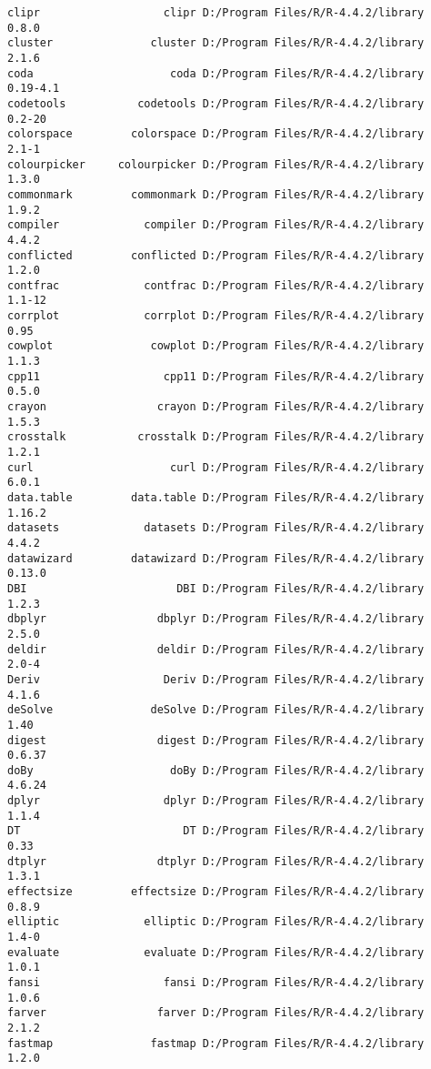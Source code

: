 \documentclass[
  letterpaper,
  DIV=11,
  numbers=noendperiod]{scrreprt}
\begin{document}
\begin{verbatim}
clipr                   clipr D:/Program Files/R/R-4.4.2/library      0.8.0
cluster               cluster D:/Program Files/R/R-4.4.2/library      2.1.6
coda                     coda D:/Program Files/R/R-4.4.2/library   0.19-4.1
codetools           codetools D:/Program Files/R/R-4.4.2/library     0.2-20
colorspace         colorspace D:/Program Files/R/R-4.4.2/library      2.1-1
colourpicker     colourpicker D:/Program Files/R/R-4.4.2/library      1.3.0
commonmark         commonmark D:/Program Files/R/R-4.4.2/library      1.9.2
compiler             compiler D:/Program Files/R/R-4.4.2/library      4.4.2
conflicted         conflicted D:/Program Files/R/R-4.4.2/library      1.2.0
contfrac             contfrac D:/Program Files/R/R-4.4.2/library     1.1-12
corrplot             corrplot D:/Program Files/R/R-4.4.2/library       0.95
cowplot               cowplot D:/Program Files/R/R-4.4.2/library      1.1.3
cpp11                   cpp11 D:/Program Files/R/R-4.4.2/library      0.5.0
crayon                 crayon D:/Program Files/R/R-4.4.2/library      1.5.3
crosstalk           crosstalk D:/Program Files/R/R-4.4.2/library      1.2.1
curl                     curl D:/Program Files/R/R-4.4.2/library      6.0.1
data.table         data.table D:/Program Files/R/R-4.4.2/library     1.16.2
datasets             datasets D:/Program Files/R/R-4.4.2/library      4.4.2
datawizard         datawizard D:/Program Files/R/R-4.4.2/library     0.13.0
DBI                       DBI D:/Program Files/R/R-4.4.2/library      1.2.3
dbplyr                 dbplyr D:/Program Files/R/R-4.4.2/library      2.5.0
deldir                 deldir D:/Program Files/R/R-4.4.2/library      2.0-4
Deriv                   Deriv D:/Program Files/R/R-4.4.2/library      4.1.6
deSolve               deSolve D:/Program Files/R/R-4.4.2/library       1.40
digest                 digest D:/Program Files/R/R-4.4.2/library     0.6.37
doBy                     doBy D:/Program Files/R/R-4.4.2/library     4.6.24
dplyr                   dplyr D:/Program Files/R/R-4.4.2/library      1.1.4
DT                         DT D:/Program Files/R/R-4.4.2/library       0.33
dtplyr                 dtplyr D:/Program Files/R/R-4.4.2/library      1.3.1
effectsize         effectsize D:/Program Files/R/R-4.4.2/library      0.8.9
elliptic             elliptic D:/Program Files/R/R-4.4.2/library      1.4-0
evaluate             evaluate D:/Program Files/R/R-4.4.2/library      1.0.1
fansi                   fansi D:/Program Files/R/R-4.4.2/library      1.0.6
farver                 farver D:/Program Files/R/R-4.4.2/library      2.1.2
fastmap               fastmap D:/Program Files/R/R-4.4.2/library      1.2.0

\end{verbatim}
\end{document}
